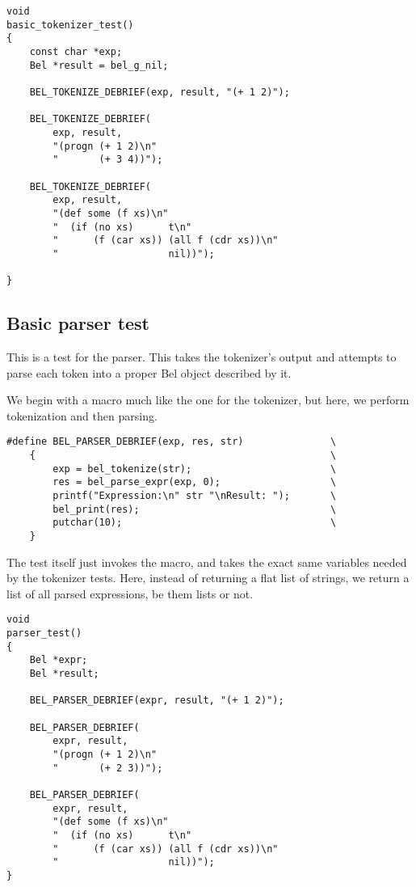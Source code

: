 \documentclass[openright,a4paper,twoside,12pt]{memoir}
\begin{document}
\begin{verbatim}
void
basic_tokenizer_test()
{
    const char *exp;
    Bel *result = bel_g_nil;

    BEL_TOKENIZE_DEBRIEF(exp, result, "(+ 1 2)");

    BEL_TOKENIZE_DEBRIEF(
        exp, result,
        "(progn (+ 1 2)\n"
        "       (+ 3 4))");

    BEL_TOKENIZE_DEBRIEF(
        exp, result,
        "(def some (f xs)\n"
        "  (if (no xs)      t\n"
        "      (f (car xs)) (all f (cdr xs))\n"
        "                   nil))");

}
\end{verbatim}

\subsection{Basic parser test}
\label{sec:org48a1c74}

This is a  test for the parser. This takes  the tokenizer's output and
attempts to  parse each token  into a  proper Bel object  described by
it.

We begin with a  macro much like the one for  the tokenizer, but here,
we perform tokenization and then parsing.

\begin{verbatim}
#define BEL_PARSER_DEBRIEF(exp, res, str)               \
    {                                                   \
        exp = bel_tokenize(str);                        \
        res = bel_parse_expr(exp, 0);                   \
        printf("Expression:\n" str "\nResult: ");       \
        bel_print(res);                                 \
        putchar(10);                                    \
    }
\end{verbatim}

The  test itself  just invokes  the macro,  and takes  the exact  same
variables needed by the tokenizer  tests. Here, instead of returning a
flat list of  strings, we return a list of  all parsed expressions, be
them lists or not.

\begin{verbatim}
void
parser_test()
{
    Bel *expr;
    Bel *result;
    
    BEL_PARSER_DEBRIEF(expr, result, "(+ 1 2)");

    BEL_PARSER_DEBRIEF(
        expr, result,
        "(progn (+ 1 2)\n"
        "       (+ 2 3))");

    BEL_PARSER_DEBRIEF(
        expr, result,
        "(def some (f xs)\n"
        "  (if (no xs)      t\n"
        "      (f (car xs)) (all f (cdr xs))\n"
        "                   nil))");
}
\end{verbatim}
\end{document}
